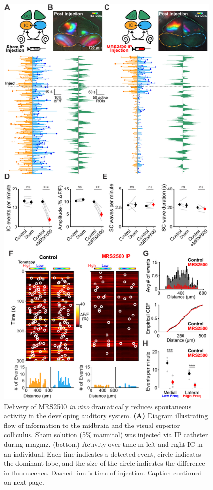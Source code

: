 \documentclass[9pt,lineno]{elife}
\begin{document}
\begin{figure}
\begin{fullwidth}
\begin{center}
\includegraphics[width=.62\linewidth]{figures/Fig8.pdf}
\end{center}
\caption{Delivery of MRS2500 \textit{in vivo} dramatically reduces spontaneous activity in the developing auditory system.
\textbf{(A)} Diagram illustrating flow of information to the midbrain and the visual superior colliculus. Sham solution (5\% mannitol) was injected via IP catheter during imaging. (bottom) Activity over time in left and right IC in an individual. Each line indicates a detected event, circle indicates the dominant lobe, and the size of the circle indicates the difference in fluorescence. Dashed line is time of injection. Caption continued on next page.}
\label{fig:f8}
\end{fullwidth}
\end{figure}
\addtocounter{figure}{-1}
\end{document}
